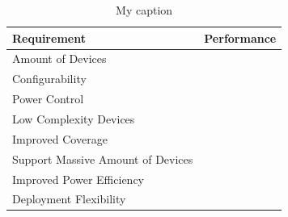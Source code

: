 \begin{table}[H]
\centering
\begin{tabular}{|l|l|} \hline
\textbf{Requirement}              & \textbf{Performance} \\ \hline
Amount of Devices                 &                      \\ \hline
Configurability                   &                      \\ \hline
Power Control                     &                      \\ \hline
Low Complexity Devices            &                      \\ \hline
Improved Coverage                 &                      \\ \hline
Support Massive Amount of Devices &                      \\ \hline
Improved Power Efficiency         &                      \\ \hline
Deployment Flexibility            &                      \\ \hline
\end{tabular}
\caption{My caption}
\label{my-label2}
\end{table}

